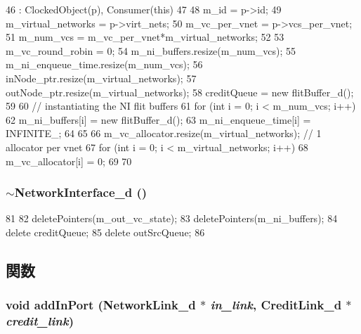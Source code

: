 \begin{DoxyCode}
46     : ClockedObject(p), Consumer(this)
47 {
48     m_id = p->id;
49     m_virtual_networks  = p->virt_nets;
50     m_vc_per_vnet = p->vcs_per_vnet;
51     m_num_vcs = m_vc_per_vnet*m_virtual_networks;
52 
53     m_vc_round_robin = 0;
54     m_ni_buffers.resize(m_num_vcs);
55     m_ni_enqueue_time.resize(m_num_vcs);
56     inNode_ptr.resize(m_virtual_networks);
57     outNode_ptr.resize(m_virtual_networks);
58     creditQueue = new flitBuffer_d();
59 
60     // instantiating the NI flit buffers
61     for (int i = 0; i < m_num_vcs; i++) {
62         m_ni_buffers[i] = new flitBuffer_d();
63         m_ni_enqueue_time[i] = INFINITE_;
64     }
65 
66     m_vc_allocator.resize(m_virtual_networks); // 1 allocator per vnet
67     for (int i = 0; i < m_virtual_networks; i++) {
68         m_vc_allocator[i] = 0;
69     }
70 }
\end{DoxyCode}
\hypertarget{classNetworkInterface__d_aba1b0a4c820667bc51ff0bd8b9e599bd}{
\subsubsection[{$\sim$NetworkInterface\_\-d}]{\setlength{\rightskip}{0pt plus 5cm}$\sim${\bf NetworkInterface\_\-d} ()}}
\label{classNetworkInterface__d_aba1b0a4c820667bc51ff0bd8b9e599bd}



\begin{DoxyCode}
81 {
82     deletePointers(m_out_vc_state);
83     deletePointers(m_ni_buffers);
84     delete creditQueue;
85     delete outSrcQueue;
86 }
\end{DoxyCode}


\subsection{関数}
\hypertarget{classNetworkInterface__d_adbdbe0df8be4baa68257ae0a5badfd2e}{
\subsubsection[{addInPort}]{\setlength{\rightskip}{0pt plus 5cm}void addInPort ({\bf NetworkLink\_\-d} $\ast$ {\em in\_\-link}, \/  {\bf CreditLink\_\-d} $\ast$ {\em credit\_\-link})}}
\label{classNetworkInterface__d_adbdbe0df8be4baa68257ae0a5badfd2e}



